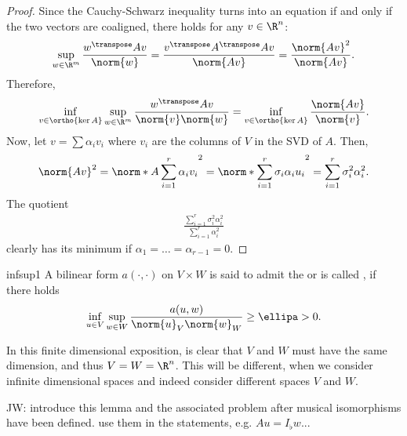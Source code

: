 \begin{proof}
  Since the Cauchy-Schwarz inequality turns into an equation if and
  only if the two vectors are coaligned, there holds for any $v\in \R^n$:
  \begin{gather}
    \sup_{w\in\R^m}\frac{w^\transpose A v}{\norm{w}} = \frac{v^\transpose A^\transpose A v}{\norm{Av}} = \frac{\norm{Av}^2}{\norm{Av}}.
  \end{gather}
  Therefore,
  \begin{gather}
    \inf_{v\in \ortho{\ker A}} \sup_{w\in \R^m}
    \frac{w^\transpose A v}{\norm{v}\norm{w}}
    = \inf_{v\in \ortho{\ker A}} \frac{\norm{Av}}{\norm{v}}.
  \end{gather}
  Now, let $v = \sum \alpha_i v_i$ where $v_i$ are the columns of $V$
  in the SVD of $A$. Then,
  \begin{gather}
    \norm{Av}^2 = \norm*{A\sum_{i=1}^r \alpha_i v_i}^2
    = \norm*{\sum_{i=1}^r \sigma_i \alpha_i u_i}^2
    = \sum_{i=1}^r \sigma_i^2 \alpha_i^2.
  \end{gather}
  The quotient
  \begin{gather}
    \frac{\sum_{i=1}^r \sigma_i^2 \alpha_i^2}{\sum_{i=1}^r \alpha_i^2}
  \end{gather}
  clearly has its minimum if $\alpha_1 = \dots=\alpha_{r-1} = 0$.
\end{proof}

\begin{Definition}{infsup1}
  A bilinear form $a(\cdot,\cdot)$ on $V\times W$ is said to admit the
   or is called , if
  there holds
  \begin{gather}
    \label{eq:infsup:1}
    \inf_{u\in V} \sup_{w\in W} \frac{a(u,w)}{\norm{u}_V\norm{w}_W}
    \ge \ellipa > 0.
  \end{gather}
\end{Definition}

\begin{remark}
  In this finite dimensional exposition, is clear that $V$ and $W$
  must have the same dimension, and thus $V=W=\R^n$. This will be
  different, when we consider infinite dimensional spaces and indeed
  consider different spaces $V$ and $W$.
\end{remark}

\begin{todo}
  JW: introduce this lemma and the associated problem after musical isomorphisms
  have been defined. use them in the statements, e.g. $Au = I_\flat w$... 
\end{todo}

